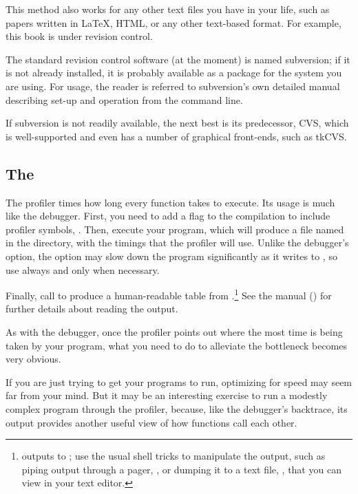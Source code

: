 This method also works for any other text files you have in your
life, such as papers written in \LaTeX, HTML, or any other text-based
format. For example, this book is under revision control.

The standard revision control software (at the moment) is named
subversion; if it is not already installed, it is probably available as
a package for the system you are using. For usage, the reader is referred
to subversion's own detailed manual describing set-up and operation from
the command line.

If subversion is not readily available, the next best is its predecessor,
CVS, which is well-supported and even has a number of graphical
front-ends, such as tkCVS.  

\subsection{The } The profiler times how long every function
takes to execute. Its usage is much like the debugger. First, you need
to add a flag to the compilation to include profiler symbols,
. Then, execute your program, which will produce a file named
 in the directory, with the timings that the profiler
will use. Unlike the debugger's  option, the 
option may slow down the program significantly as it writes to
, so use  always and  only
when necessary.

Finally, call  to produce a
human-readable table from .\footnote{
outputs to ; use the usual shell tricks to manipulate
the output, such as piping output through a pager, , or dumping it to a text file, , that you can view in your text editor.}
See the manual () for further details about reading
the output.

As with the debugger, once the profiler points out where the most time
is being taken by your program, what you need to do to alleviate the
bottleneck becomes very obvious.

If you are just trying to get your programs to run, optimizing for speed 
may seem far from your mind. But it may be an interesting exercise to
run a modestly complex program through the profiler, because, like the
debugger's backtrace, its output provides another useful view of how
functions call each other.

